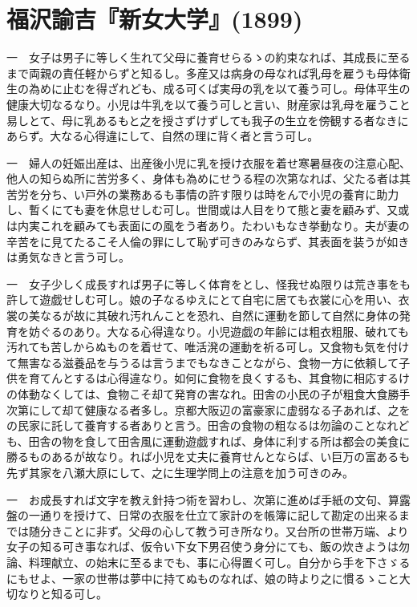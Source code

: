 \section{福沢諭吉『新女大学』(1899)}

\noindent{}一　女子は男子に等しく生れて父母に養育せらるゝの約束なれば、其成長に至るまで両親の責任軽からずと知るし。多産又は病身の母なれば乳母を雇うも母体衛生の為めに止むを得ざれども、成る可くば実母の乳を以て養う可し。母体平生の健康大切なるなり。小児は牛乳を以て養う可しと言い、財産家は乳母を雇うこと易しとて、母に乳あるもと之を授さずけずしても我子の生立を傍観する者なきにあらず。大なる心得違にして、自然の理に背く者と言う可し。

\noindent{}一　婦人の妊娠出産は、出産後小児に乳を授け衣服を着せ寒暑昼夜の注意心配、他人の知らぬ所に苦労多く、身体も為めにせうる程の次第なれば、父たる者は其苦労を分ち、い戸外の業務あるも事情の許す限りは時をんで小児の養育に助力し、暫くにても妻を休息せしむ可し。世間或は人目をりて態と妻を顧みず、又或は内実これを顧みても表面にの風をう者あり。たわいもなき挙動なり。夫が妻の辛苦をに見てたるこそ人倫の罪にして恥ず可きのみならず、其表面を装うが如きは勇気なきと言う可し。

\noindent{}一　女子少しく成長すれば男子に等しく体育をとし、怪我せぬ限りは荒き事をも許して遊戯せしむ可し。娘の子なるゆえにとて自宅に居ても衣裳に心を用い、衣裳の美なるが故に其破れ汚れんことを恐れ、自然に運動を節して自然に身体の発育を妨ぐるのあり。大なる心得違なり。小児遊戯の年齢には粗衣粗服、破れても汚れても苦しからぬものを着せて、唯活溌の運動を祈る可し。又食物も気を付けて無害なる滋養品を与うるは言うまでもなきことながら、食物一方に依頼して子供を育てんとするは心得違なり。如何に食物を良くするも、其食物に相応するけの体動なくしては、食物こそ却て発育の害なれ。田舎の小民の子が粗食大食勝手次第にして却て健康なる者多し。京都大阪辺の富豪家に虚弱なる子あれば、之をの民家に託して養育する者ありと言う。田舎の食物の粗なるは勿論のことなれども、田舎の物を食して田舎風に運動遊戯すれば、身体に利する所は都会の美食に勝るものあるが故なり。れば小児を丈夫に養育せんとならば、い巨万の富あるも先ず其家を八瀬大原にして、之に生理学問上の注意を加う可きのみ。

\noindent{}一　お成長すれば文字を教え針持つ術を習わし、次第に進めば手紙の文句、算露盤の一通りを授けて、日常の衣服を仕立て家計のを帳簿に記して勘定の出来るまでは随分きことに非ず。父母の心して教う可き所なり。又台所の世帯万端、より女子の知る可き事なれば、仮令い下女下男召使う身分にても、飯の炊きようは勿論、料理献立、の始末に至るまでも、事に心得置く可し。自分から手を下さゞるにもせよ、一家の世帯は夢中に持てぬものなれば、娘の時より之に慣るゝこと大切なりと知る可し。

